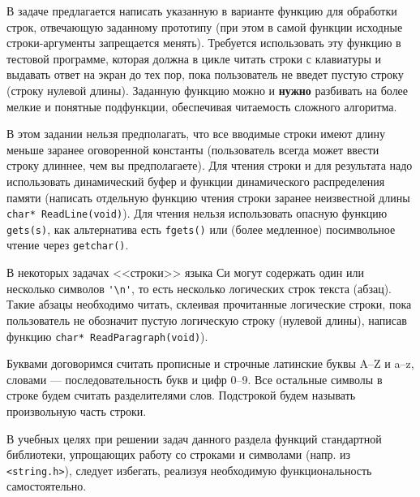 
В задаче предлагается написать указанную в варианте функцию для обработки строк,
отвечающую заданному прототипу (при этом в самой функции исходные строки-аргументы
запрещается менять). Требуется использовать эту функцию в тестовой программе,
которая должна в цикле читать строки с клавиатуры и выдавать ответ на экран до
тех пор, пока пользователь не введет пустую строку (строку нулевой длины). 
Заданную функцию можно и \textbf{нужно} разбивать на более мелкие и понятные
подфункции, обеспечивая читаемость сложного алгоритма.

В этом задании нельзя предполагать, что все вводимые строки имеют длину меньше
заранее оговоренной константы (пользователь всегда может ввести строку длиннее,
чем вы предполагаете). Для чтения строки и для результата надо использовать
динамический буфер и функции динамического распределения памяти (написать отдельную
функцию чтения строки заранее неизвестной длины \texttt{char* ReadLine(void)}).
Для чтения нельзя использовать опасную функцию \texttt{gets(s)},
как альтернатива есть \texttt{fgets()} или (более медленное) посимвольное чтение
через \texttt{getchar()}.

В некоторых задачах <<строки>> языка Си
могут содержать один или несколько символов \verb|'\n'|, то есть несколько
логических строк текста (абзац). Такие абзацы необходимо читать, склеивая
прочитанные логические строки, пока пользователь не обозначит пустую логическую
строку (нулевой длины), написав функцию \texttt{char* ReadParagraph(void)}).

Буквами договоримся считать прописные и строчные латинские буквы 
A--Z и a--z, словами --- последовательность букв и цифр 0--9. Все остальные
символы в строке будем считать разделителями слов. Подстрокой будем называть
произвольную часть строки.

В учебных целях при решении задач данного раздела функций стандартной
библиотеки, упрощающих работу со строками и символами (напр. из 
\texttt{<string.h>}), следует избегать, реализуя необходимую
функциональность самостоятельно.

